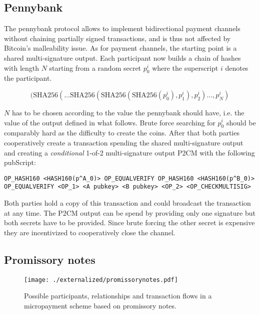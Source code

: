 \subsection{Pennybank}

The pennybank protocol allows to implement bidirectional payment channels without chaining partially signed transactions, and is thus not affected by Bitcoin's malleability issue. As for payment channels, the starting point is a shared multi-signature output. Each participant now builds a chain of hashes with length $N$ starting from a random secret $p^i_0$ where the superscript $i$ denotes the participant. 

\begin{equation*}
(\text{SHA256}(... \text{SHA256}(\text{SHA256}(\text{SHA256}(p^i_0),p^i_1),p^i_2)...,p^i_N)
\end{equation*}

$N$ has to be chosen according to the value the pennybank should have, i.e. the value of the output defined in what follows. Brute force searching for $p^i_0$ should be comparably hard as the difficulty to create the coins.  After that both parties cooperatively create a transaction spending the shared multi-signature output and creating a \emph{conditional} 1-of-2 multi-signature output P2CM with the following pubScript:

\begin{lstlisting}
OP_HASH160 <HASH160(p^A_0)> OP_EQUALVERIFY OP_HASH160 <HASH160(p^B_0)> OP_EQUALVERIFY <OP_1> <A pubkey> <B pubkey> <OP_2> <OP_CHECKMULTISIG>
\end{lstlisting}

Both parties hold a copy of this transaction and could broadcast the transaction at any time. The P2CM output can be spend by providing only one signature but both secrets have to be provided. Since brute forcing the other secret is expensive they are incentivized to cooperatively close the channel.


\subsection{Promissory notes}

\cite{strawpay}
\cite{filament}

\begin{figure}
\centering
\texttt{[image: ./externalized/promissorynotes.pdf]}
\caption{Possible participants, relationships and transaction flows in a micropayment scheme based on promissory notes.}
\label{fig:promissorynotes}
\end{figure}


